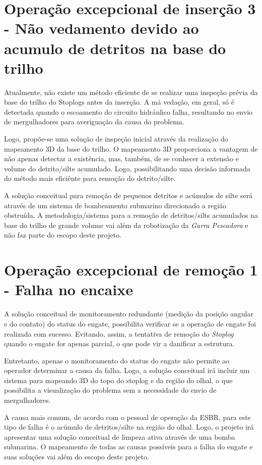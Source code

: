 


\section{Operação excepcional de inserção 3 - Não vedamento devido ao acumulo de detritos na base do trilho}

Atualmente, não existe um método eficiente de se realizar uma inspeção prévia da
base do trilho do Stoplogs antes da inserção. A má vedação, em geral, só é
detectada quando o escoamento do circuito hidráulico falha, resultando no envio de mergulhadores para averiguação da causa do problema.

Logo, propõe-se uma solução de inspeção inicial através da realização do mapeamento 3D da base do trilho.
O mapeamento 3D proporciona a vantagem de não apenas detectar a existência,
mas, também, de se conhecer a extensão e volume do detrito/silte acumulado.
Logo, possibilitando uma decisão informada do método mais eficiênte para remoção do detrito/silte.

A solução conceitual para remoção de pequenos detritos e acúmulos de silte será
através de um sistema de bombeamento submarino direcionado a região obstruída. A metodologia/sistema para a remoção de detritos/silts acumulados na base do trilho de grande volume vai além da robotização da \emph{Garra Pescadora} e não faz parte do escopo deste projeto.



\section{Operação excepcional de remoção 1 - Falha no encaixe}

A solução conceitual de monitoramento redundante (medição da posição angular e
do contato) do status do engate, possibilita verificar se a operação de engate foi realizada com sucesso. Evitando, assim, a tentativa de remoção do \emph{Stoplog} quando o engate for apenas parcial, o que pode vir a danificar a estrutura.

Entretanto, apenas o monitoramento do status do engate não permite ao operador determinar a causa da falha. Logo, a solução conceitual irá incluir um sistema para mapeando 3D do topo do stoplog e da região do olhal, o que possibilita a visualização do problema sem a necessidade do envio
de mergulhadores. 

A causa mais comum, de acordo com o pessoal de operação da ESBR, para este tipo
de falha é o acúmulo de detritos/silte na região do olhal. Logo, o projeto irá apresentar uma solução conceitual de limpeza ativa através de uma bomba submarina. O mapeamento de todas as causas possíveis para a falha do engate e suas soluções vai além do escopo deste projeto.

